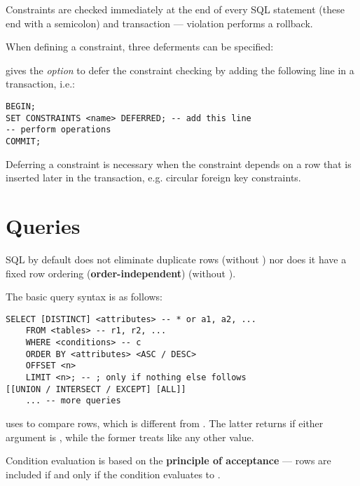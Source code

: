 Constraints are checked immediately at the end of every SQL statement (these end with a semicolon) and transaction --- violation performs a rollback.

When defining a constraint, three deferments can be specified:
\begin{enumerate*}
\end{enumerate*}

 gives the \textit{option} to defer the constraint checking by adding the following line in a transaction, i.e.:

\begin{lstlisting}
BEGIN;
SET CONSTRAINTS <name> DEFERRED; -- add this line
-- perform operations
COMMIT;
\end{lstlisting}

Deferring a constraint is necessary when the constraint depends on a row that is inserted later in the transaction, e.g. circular foreign key constraints.


\section{Queries}
SQL by default does not eliminate duplicate rows (without ) nor does it have a fixed row ordering (\textbf{order-independent}) (without ).

The basic query syntax is as follows:
\begin{lstlisting}
SELECT [DISTINCT] <attributes> -- * or a1, a2, ...
    FROM <tables> -- r1, r2, ...
    WHERE <conditions> -- c
    ORDER BY <attributes> <ASC / DESC>
    OFFSET <n>
    LIMIT <n>; -- ; only if nothing else follows
[[UNION / INTERSECT / EXCEPT] [ALL]]
    ... -- more queries
\end{lstlisting}

 uses  to compare rows, which is different from \code{=}.
The latter returns  if either argument is , while the former treats  like any other value.

Condition evaluation is based on the \textbf{principle of acceptance} --- rows are included if and only if the condition evaluates to .

